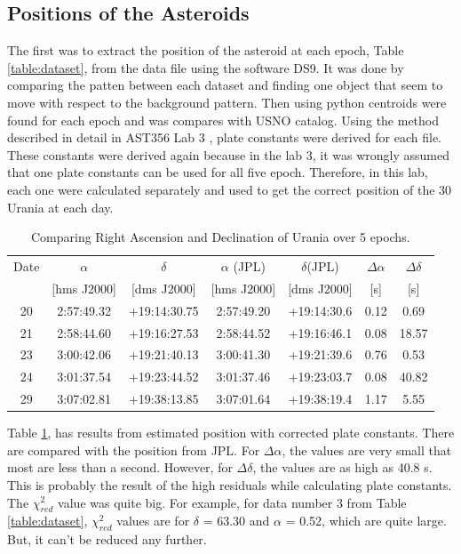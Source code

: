 \documentclass[a4paper,12pt]{article}
\begin{document}
\subsection{Positions of the Asteroids}
\label{sec:position}
The first was to extract the position of the asteroid at each epoch, Table \ref{table:dataset}, from the data file using the software DS9. It was done by comparing the patten between each dataset and finding one object that seem to move with respect to the background pattern. Then using python centroids were found for each epoch and was compares with USNO catalog. Using the method described in detail in AST356 Lab 3 \cite{lab3}, plate constants were derived for each file. These constants were derived again because in the lab 3, it was wrongly assumed that one plate constants can be used for all five epoch. Therefore, in this lab, each one were calculated separately and used to get the correct position of the 30 Urania at each day. 
\begin{table}[H]
\centering %
\caption{Comparing Right Ascension and Declination of Urania over 5 epochs.}
\footnotesize
\begin{tabular}{ccccccc}%
\hline
\hline
Date  & $\alpha$ & $\delta$ & $\alpha$ (JPL) & $\delta$(JPL) & $\Delta \alpha$ & $\Delta \delta$ \\
& [hms J2000]&[dms J2000] &[hms J2000]&[dms J2000]&[s]&[s]\\
\hline
\hline
20 & 2:57:49.32& +19:14:30.75 &2:57:49.20& +19:14:30.6&0.12&0.69\\
21 & 2:58:44.60& +19:16:27.53 &2:58:44.52& +19:16:46.1&0.08&18.57\\
23 & 3:00:42.06& +19:21:40.13 &3:00:41.30& +19:21:39.6&0.76&0.53\\
24 & 3:01:37.54& +19:23:44.52 &3:01:37.46& +19:23:03.7&0.08&40.82\\
29 & 3:07:02.81& +19:38:13.85 &3:07:01.64& +19:38:19.4&1.17&5.55\\


\hline
\hline
\end{tabular}
\label{table:position} %
\end{table}
Table \ref{table:position}, has results from estimated position with corrected plate constants. There are compared with the position from JPL. For $\Delta \alpha$, the values are very small that most are less than a second. However, for $\Delta \delta$, the values are as high as 40.8 s. This is probably the result of the high residuals while calculating plate constants. The $\chi_{red}^2$ value was quite big. For example, for data number 3 from Table \ref{table:dataset}, $\chi_{red}^2$ values are for $\delta$ = 63.30 and $\alpha$ = 0.52, which are quite large. But, it can't be reduced any further.
\end{document}
